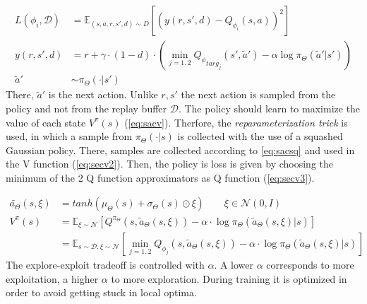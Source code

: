 \begin{align}
	L(\phi_i, \mathcal{D}) &= \mathbb{E}_{(s, a, r, s',d) \sim D} [(y(r,s',d) - Q_{\phi_i}(s,a))^2] \label{eq:sacloss}\\
	y(r,s',d) &= r + \gamma \cdot (1-d) \cdot
	(
	\min_{j=1,2} 
	{{}Q_\phi}_{targ_j}
	(s', \tilde{a}') - \alpha \log 
	\pi_{\Theta} (\tilde{a}'|s') )\label{eq:sactarget}\\
	\tilde{a}' &\sim \pi_{\Theta}(\cdot | s') \nonumber
 \end{align}
 There, $\tilde{a}'$ is the next action. Unlike $r,s'$ the next action is sampled from the policy and not from the replay buffer $\mathcal{D}$.
 \newpage
 The policy should learn to maximize the value of each state $V^{\pi} (s)$ (\cref{eq:sacv}). Therfore, the \emph{reparameterization trick} is used, in which a sample from $\pi_{\Theta}(\cdot | s)$ is collected with the use of a squashed Gaussian policy. There, samples are collected according to \cref{eq:sacsq} and used in the V function (\cref{eq:secv2}). Then, the policy is loss is given by choosing the minimum of the 2 Q function approximators as Q function (\cref{eq:secv3}).
 
 \begin{align}
 	\tilde{a_\Theta} (s, \xi) &= tanh(\mu_{\Theta}(s) + \sigma_{\Theta}(s) \odot \xi) \qquad \xi \in \mathcal{N}(0,I) \label{eq:sacsq}\\
 	V^{\pi} (s) &= \mathbb{E}_{\xi \sim \mathcal{N}} [Q^{\pi_\Theta} (s, \tilde{a}_\Theta(s, \xi)) - \alpha \cdot 
 	\log \pi_\Theta (\tilde{a}_\Theta(s, \xi)| s)
 	] \label{eq:secv2}\\
 	&= \mathbb{E}_{s \sim \mathcal{D}, \xi \sim \mathcal{N}} [\min_{j=1,2}
 	 Q_{\phi_j} (s, \tilde{a}_\Theta(s, \xi)) - \alpha \cdot 
 	\log \pi_\Theta (\tilde{a}_\Theta(s, \xi)| s)
 	] \label{eq:secv3}
 \end{align}
  The explore-exploit tradeoff is controlled with $\alpha$. A lower $\alpha$ corresponds to more exploitation, a higher $\alpha$ to more exploration. During training it is optimized in order to avoid getting stuck in local optima.

